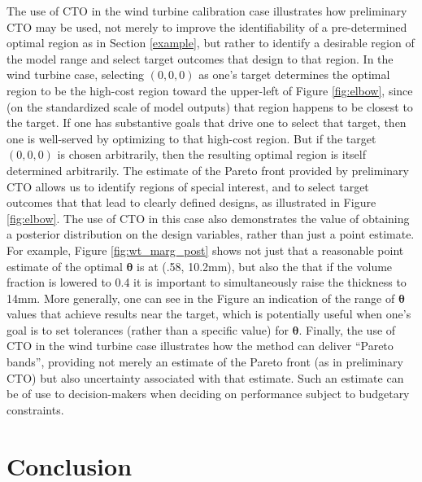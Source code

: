 \documentclass[12pt]{article}
\begin{document}
The use of CTO in the wind turbine calibration case illustrates how preliminary CTO may be used, not merely to improve the identifiability of a pre-determined optimal region as in Section \ref{example}, but rather to identify a desirable region of the model range and select target outcomes that design to that region.
%
In the wind turbine case, selecting $(0,0,0)$ as one's target determines the optimal region to be the high-cost region toward the upper-left of Figure \ref{fig:elbow}, since (on the standardized scale of model outputs) that region happens to be closest to the target.
%
If one has substantive goals that drive one to select that target, then one is well-served by optimizing to that high-cost region.
%
But if the target $(0,0,0)$ is chosen arbitrarily, then the resulting optimal region is itself determined arbitrarily.
%
The estimate of the Pareto front provided by preliminary CTO allows us to identify regions of special interest, and to select target outcomes that that lead to clearly defined designs, as illustrated in Figure \ref{fig:elbow}.
%
The use of CTO in this case also demonstrates the value of obtaining a posterior distribution on the design variables, rather than just a point estimate.
%
For example, Figure \ref{fig:wt_marg_post} shows not just that a reasonable point estimate of the optimal $\boldsymbol\theta$ is at (.58, 10.2mm), but also the that if the volume fraction is lowered to 0.4 it is important to simultaneously raise the thickness to 14mm.
%
More generally, one can see in the Figure an indication of the range of $\boldsymbol\theta$ values that achieve results near the target, which is potentially useful when one's goal is to set tolerances (rather than a specific value) for $\boldsymbol\theta$.
%
Finally, the use of CTO in the wind turbine case illustrates how the method can deliver ``Pareto bands'', providing not merely an estimate of the Pareto front (as in preliminary CTO) but also uncertainty associated with that estimate.
%
Such an estimate can be of use to decision-makers when deciding on performance subject to budgetary constraints.




\section{Conclusion} \label{conclusion}
\end{document}
